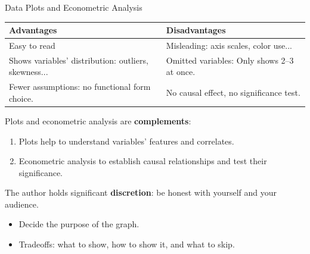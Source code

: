 \documentclass[9pt,aspectratio=169]{beamer}
\begin{document}
\begin{frame}{Data Plots and Econometric Analysis}
\linespread{1.2}\selectfont

\medskip
\begin{center}
\small
\begin{tabular}{>{\centering\arraybackslash}p{}>{\centering\arraybackslash}p{}}
\toprule
\textbf{Advantages} & \textbf{Disadvantages} \\
\midrule
Easy to read
  & Misleading: axis scales, color use... \\
\addlinespace
Shows variables' distribution: outliers, skewness...
  & Omitted variables: Only shows 2--3 at once. \\
\addlinespace
Fewer assumptions: no functional form choice.
  & No causal effect, no significance test. \\
\bottomrule
\end{tabular}
\end{center}

\vspace{0.3cm}
\pause
Plots and econometric analysis are \textbf{complements}: 
\begin{enumerate}
  \item Plots help to understand variables' features and correlates.
  \item Econometric analysis to establish causal relationships and test their significance.
\end{enumerate}
\vspace{0.3cm}
\pause
The author holds significant \textbf{discretion}: be honest with yourself and your audience.
\begin{itemize}
  \item Decide the purpose of the graph.
  \item Tradeoffs: what to show, how to show it, and what to skip.
\end{itemize}
\end{frame}
\end{document}
